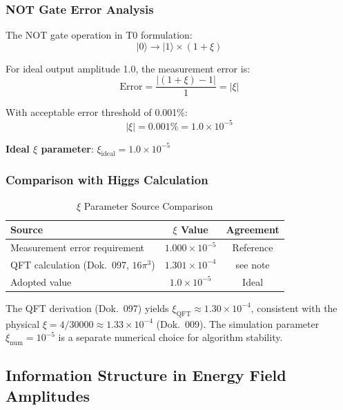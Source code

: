 	\subsubsection{NOT Gate Error Analysis}
	
	The NOT gate operation in T0 formulation:
	\begin{equation}
		|0\rangle \rightarrow |1\rangle \times (1 + \xi)
	\end{equation}
	
	For ideal output amplitude 1.0, the measurement error is:
	\begin{equation}
		\text{Error} = \frac{|(1 + \xi) - 1|}{1} = |\xi|
	\end{equation}
	
	With acceptable error threshold of 0.001\%:
	\begin{equation}
		|\xi| = 0.001\% = 1.0 \times 10^{-5}
	\end{equation}
	
	\textbf{Ideal $\xi$ parameter}: $\xi_{\text{ideal}} = 1.0 \times 10^{-5}$
	
	\subsubsection{Comparison with Higgs Calculation}
	
	\begin{table}[htbp]
		\centering
		\begin{tabular}{lcc}
			\toprule
			\textbf{Source} & \textbf{$\xi$ Value} & \textbf{Agreement} \\
			\midrule
			Measurement error requirement & $1.000 \times 10^{-5}$ & Reference \\
			QFT calculation (Dok.~097, $16\pi^3$) & $1.301 \times 10^{-4}$ & see note \\
			Adopted value & $1.0 \times 10^{-5}$ & Ideal \\
			\bottomrule
		\end{tabular}
		\caption{$\xi$ Parameter Source Comparison}
	\end{table}
	
	The QFT derivation (Dok.~097) yields $\xi_{\text{QFT}} \approx 1.30 \times 10^{-4}$, consistent with the physical $\xi = 4/30000 \approx 1.33 \times 10^{-4}$ (Dok.~009). The simulation parameter $\xi_{\text{num}} = 10^{-5}$ is a separate numerical choice for algorithm stability.
	
	\subsection{Information Structure in Energy Field Amplitudes}
	
